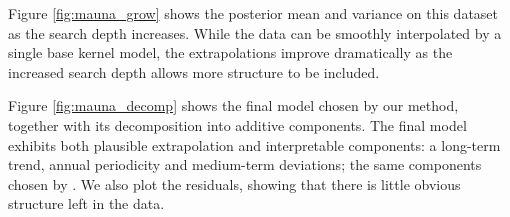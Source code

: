 Figure \ref{fig:mauna_grow} shows the posterior mean and variance on this dataset as the search depth increases.
While the data can be smoothly interpolated by a single base kernel model, the extrapolations improve dramatically as the increased search depth allows more structure to be included.

Figure \ref{fig:mauna_decomp} shows the 
final model chosen by our method, together with its decomposition into additive components.
The final model exhibits both plausible extrapolation and interpretable components: a long-term trend, annual periodicity and medium-term deviations; the same components chosen by \citet{rasmussen38gaussian}.
We also plot the residuals, showing that there is little obvious structure left in the data.  
%
%








